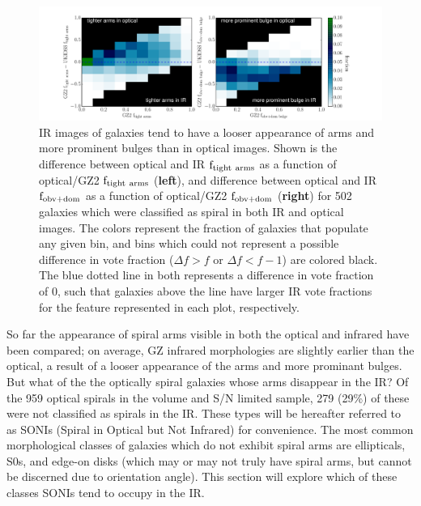 \begin{figure}
\centering
\includegraphics[width=1\textwidth,trim={4cm 0cm 4cm 0cm},clip]{figures/t_type.pdf}
\caption{IR images of galaxies tend to have a looser appearance of arms and more prominent bulges than in optical images. Shown is the difference between optical and IR $\rm f_{tight~arms}$ as a function of optical/GZ2 $\rm f_{tight~arms}$ (\textbf{left}), and difference between optical and IR $\rm f_{obv+dom}$ as a function of optical/GZ2 $\rm f_{obv+dom}$ (\textbf{right}) for 502 galaxies which were classified as spiral in both IR and optical images. The colors represent the fraction of galaxies that populate any given bin, and bins which could not represent a possible difference in vote fraction ($\Delta f > f$ or $\Delta f < f-1$) are colored black. The blue dotted line in both represents a difference in vote fraction of 0, such that galaxies above the line have larger IR vote fractions for the feature represented in each plot, respectively.}
\label{fig:ttype}
\end{figure}

So far the appearance of spiral arms visible in both the optical and infrared have been compared; on average, GZ infrared morphologies are slightly earlier than the optical, a result of a looser appearance of the arms and more prominant bulges. But what of the the optically spiral galaxies whose arms disappear in the IR? Of the 959 optical spirals in the volume and S/N limited sample, 279 (29\%) of these were not classified as spirals in the IR. These types will be hereafter referred to as SONIs (Spiral in Optical but Not Infrared) for convenience. The most common morphological classes of galaxies which do not exhibit spiral arms are ellipticals, S0s, and edge-on disks (which may or may not truly have spiral arms, but cannot be discerned due to orientation angle). This section will explore which of these classes SONIs tend to occupy in the IR. 


